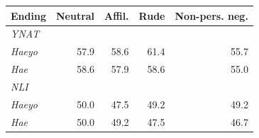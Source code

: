 \begin{tabular}{lrrrr}
\toprule
Ending & Neutral & Affil. & Rude & Non-pers. neg. \\
\midrule
\multicolumn{5}{l}{\textit{YNAT}} \\
\textit{Haeyo} & 57.9 & 58.6 & 61.4 & 55.7 \\
\textit{Hae} & 58.6 & 57.9 & 58.6 & 55.0 \\
\multicolumn{5}{l}{\textit{NLI}} \\
\textit{Haeyo} & 50.0 & 47.5 & 49.2 & 49.2 \\
\textit{Hae} & 50.0 & 49.2 & 47.5 & 46.7 \\
\bottomrule
\end{tabular}
